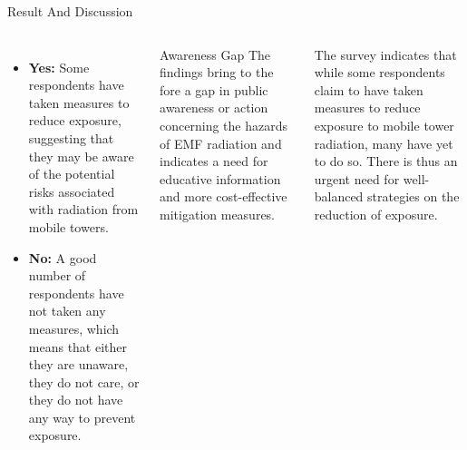 \documentclass[7pt, aspectratio=169]{beamer}
\begin{document}
\begin{frame}{Result And Discussion}
\begin{columns}
    \begin{itemize}
        \item \textbf{Yes:} Some respondents have taken measures to reduce exposure, suggesting that they may be aware of the potential risks associated with radiation from mobile towers.
        \item \textbf{No:} A good number of respondents have not taken any measures, which means that either they are unaware, they do not care, or they do not have any way to prevent exposure.
    \end{itemize}

    
    \begin{block}{Awareness Gap}
    The findings bring to the fore a gap in public awareness or action concerning the hazards of EMF radiation and indicates a need for educative information and more cost-effective mitigation measures.
    \end{block}
    The survey indicates that while some respondents claim to have taken measures to reduce exposure to mobile tower radiation, many have yet to do so. There is thus an urgent need for well-balanced strategies on the reduction of exposure.
\end{columns}
    
\end{frame}
\end{document}
